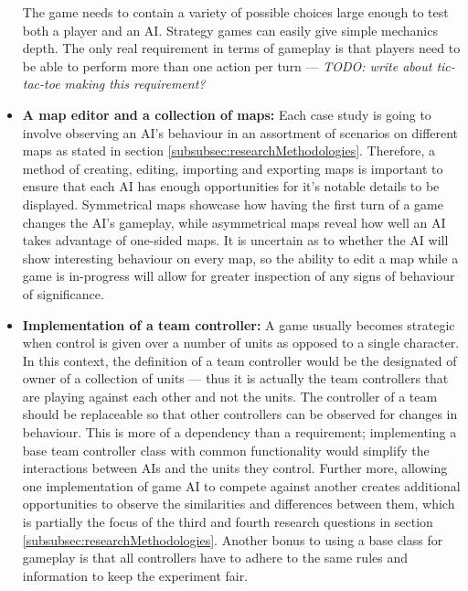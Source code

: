 \documentclass[11pt, a4paper]{article}
\begin{document}
\begin{itemize}
The game needs to contain a variety of possible choices large enough to test both a player and an AI. Strategy games can easily give simple mechanics depth. The only real requirement in terms of gameplay is that players need to be able to perform more than one action per turn --- \emph{TODO: write about tic-tac-toe making this requirement?}

\item \textbf{A map editor and a collection of maps:}
Each case study is going to involve observing an AI's behaviour in an assortment of scenarios on different maps as stated in section \ref{subsubsec:researchMethodologies}. Therefore, a method of creating, editing, importing and exporting maps is important to ensure that each AI has enough opportunities for it's notable details to be displayed. Symmetrical maps showcase how having the first turn of a game changes the AI's gameplay, while asymmetrical maps reveal how well an AI takes advantage of one-sided maps. It is uncertain as to whether the AI will show interesting behaviour on every map, so the ability to edit a map while a game is in-progress will allow for greater inspection of any signs of behaviour of significance.

\item \textbf{Implementation of a team controller:}
A game usually becomes strategic when control is given over a number of units as opposed to a single character. In this context, the definition of a team controller would be the designated of owner of a collection of units --- thus it is actually the team controllers that are playing against each other and not the units. The controller of a team should be replaceable so that other controllers can be observed for changes in behaviour. This is more of a dependency than a requirement; implementing a base team controller class with common functionality would simplify the interactions between AIs and the units they control. Further more, allowing one implementation of game AI to compete against another creates additional opportunities to observe the similarities and differences between them, which is partially the focus of the third and fourth research questions in section \ref{subsubsec:researchMethodologies}. Another bonus to using a base class for gameplay is that all controllers have to adhere to the same rules and information to keep the experiment fair.


\end{itemize}
\end{document}
